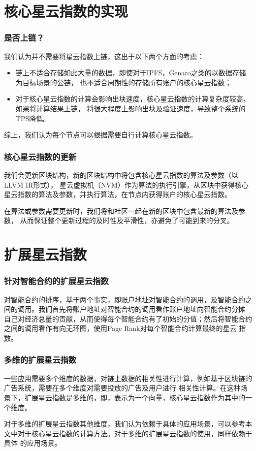 \section{核心星云指数的实现}
\begin{frame}\frametitle{是否上链？}
	我们认为并不需要将星云指数上链，这出于以下两个方面的考虑：
\begin{itemize}
\item 链上不适合存储如此大量的数据，即使对于IPFS，Genaro之类的以数据存储为目标场景的公链，
也不适合周期性的存储所有账户的核心星云指数；
\item 对于核心星云指数的计算会影响出块速度，核心星云指数的计算复杂度较高，如果将计算结果上链，
将很大程度上影响出块及验证速度，导致整个系统的TPS降低。
\end{itemize}
\noindent 综上，我们认为每个节点可以根据需要自行计算核心星云指数。
\end{frame}

\begin{frame}\frametitle{核心星云指数的更新}
我们会更新区块结构，新的区块结构中将包含核心星云指数的算法及参数（以LLVM IR形式），
星云虚拟机（NVM）作为算法的执行引擎，从区块中获得核心星云指数的算法及参数，并执行算法，在节点内获得账户的核心星云指数。

在算法或参数需要更新时，我们将和社区一起在新的区块中包含最新的算法及参数，
从而保证整个更新过程的及时性及平滑性，亦避免了可能到来的分叉。
\end{frame}

\section{扩展星云指数}

\begin{frame}\frametitle{针对智能合约的扩展星云指数}
对智能合约的排序，基于两个事实，即账户地址对智能合约的调用，及智能合约之间的调用。我们首先将账户地址对智能合约的调用看作账户地址向智能合约分摊
自己对经济总量的贡献，从而使得每个智能合约有了初始的分值；然后将智能合约之间的调用看作有向无环图，使用Page Rank对每个智能合约计算最终的星云
指数。
\end{frame}

\begin{frame}\frametitle{多维的扩展星云指数}
一些应用需要多个维度的数据，对链上数据的相关性进行计算，例如基于区块链的广告系统，需要在多个维度对需要投放的广告及用户进行
相关性计算。在这种场景下，扩展星云指数是多维的，即，表示为一个向量，核心星云指数作为其中的一个维度。

对于多维的扩展星云指数其他维度，我们认为依赖于具体的应用场景，可以参考本文中对于核心星云指数的计算方法。对于多维的扩展星云指数的使用，同样依赖于具体
的应用场景。
\end{frame}

